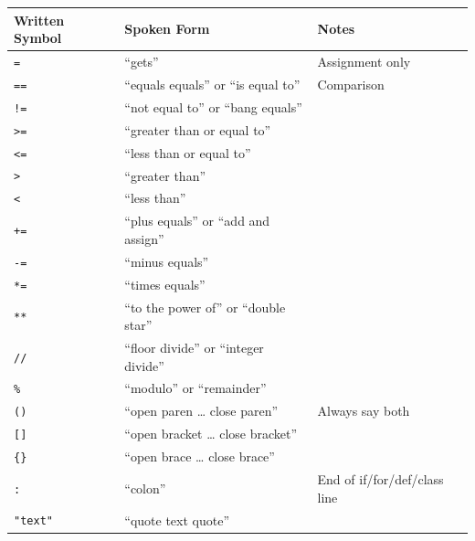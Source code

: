\documentclass[
  justified,
  openright,
]{tufte-book}
\begin{document}
{\def\LTcaptype{none} %
\begin{longtable}[]{@{}
  >{\raggedright\arraybackslash}p{}
  >{\raggedright\arraybackslash}p{}
  >{\raggedright\arraybackslash}p{}@{}}
\toprule\noalign{}
\begin{minipage}[b]{\linewidth}\raggedright
Written Symbol
\end{minipage} & \begin{minipage}[b]{\linewidth}\raggedright
Spoken Form
\end{minipage} & \begin{minipage}[b]{\linewidth}\raggedright
Notes
\end{minipage} \\
\midrule\noalign{}
\endhead
\bottomrule\noalign{}
\endlastfoot
\texttt{=} & ``gets'' & Assignment only \\
\texttt{==} & ``equals equals'' or ``is equal to'' & Comparison \\
\texttt{!=} & ``not equal to'' or ``bang equals'' & \\
\texttt{\textgreater{}=} & ``greater than or equal to'' & \\
\texttt{\textless{}=} & ``less than or equal to'' & \\
\texttt{\textgreater{}} & ``greater than'' & \\
\texttt{\textless{}} & ``less than'' & \\
\texttt{+=} & ``plus equals'' or ``add and assign'' & \\
\texttt{-=} & ``minus equals'' & \\
\texttt{*=} & ``times equals'' & \\
\texttt{**} & ``to the power of'' or ``double star'' & \\
\texttt{//} & ``floor divide'' or ``integer divide'' & \\
\texttt{\%} & ``modulo'' or ``remainder'' & \\
\texttt{()} & ``open paren \ldots{} close paren'' & Always say both \\
\texttt{{[}{]}} & ``open bracket \ldots{} close bracket'' & \\
\texttt{\{\}} & ``open brace \ldots{} close brace'' & \\
\texttt{:} & ``colon'' & End of if/for/def/class line \\
\texttt{"text"} & ``quote text quote'' & \\

\end{longtable}}
\end{document}
